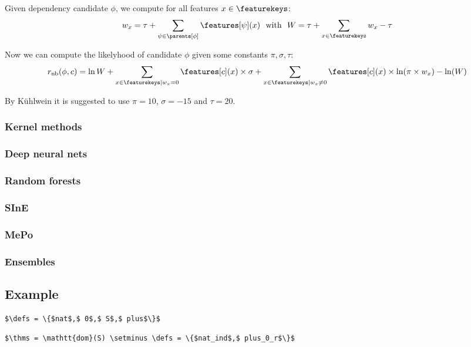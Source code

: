 Given dependency candidate $\phi$, we compute for all features $x \in \featurekeys$:
\[
	w_x = \tau + \sum_{\psi \in \parents[\phi]} \features[\psi](x) ~~\text{with}~~ W = \tau + \sum_{x \in \featurekeys} w_x - \tau
\]

Now we can compute the likelyhood of candidate $\phi$ given some constants $\pi, \sigma, \tau$:
\[
	r_\text{nb}(\phi, c) = \ln W +
	\sum_{x \in \featurekeys | w_x = 0} \features[c](x) \times \sigma +
	\sum_{x \in \featurekeys | w_x \neq 0} \features[c](x) \times \ln(\pi \times w_x) - \ln(W)
\]

By K\"uhlwein \cite{kuhlwein2013mash} it is suggested to use $\pi = 10$, $\sigma = -15$ and $\tau = 20$.

\subsubsection{Kernel methods}
\subsubsection{Deep neural nets}
\subsubsection{Random forests}
\subsubsection{SInE}
\subsubsection{MePo}
\subsubsection{Ensembles}

\subsection{Example}

\begin{lstlisting}[language=Coq, mathescape, frame=none]
$\defs = \{$nat$,$ 0$,$ S$,$ plus$\}$
\end{lstlisting}

\begin{lstlisting}[language=Coq, mathescape, frame=none]
$\thms = \mathtt{dom}(S) \setminus \defs = \{$nat_ind$,$ plus_0_r$\}$
\end{lstlisting}

